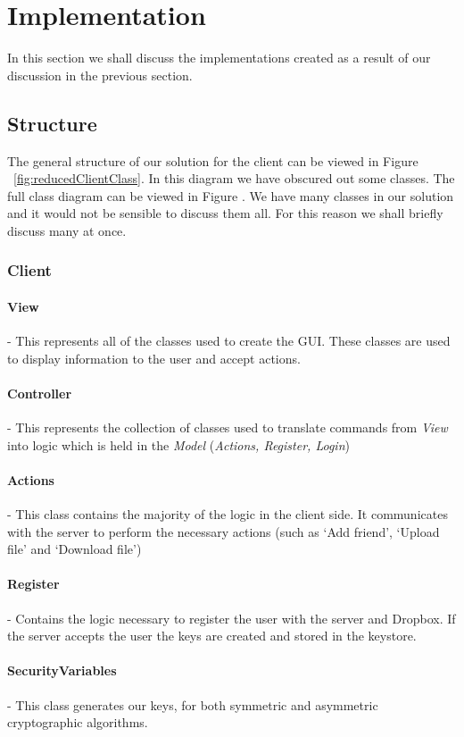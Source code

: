 \documentclass[12pt, titlepage]{article}
\begin{document}
\section{Implementation}
In this section we shall discuss the implementations created as a result of our discussion in the previous section.
\subsection{Structure}
The general structure of our solution for the client can be viewed in Figure ~\ref{fig:reducedClientClass}. In this diagram we have obscured out some classes. The full class diagram can be viewed in Figure .
\newline \indent We have many classes in our solution and it would not be sensible to discuss them all. For this reason we shall briefly discuss many at once.

\subsubsection{Client}

\paragraph*{View} - This represents all of the classes used to create the GUI. These classes are used to display information to the user and accept actions.
\paragraph*{Controller} - This represents the collection of classes used to translate commands from \textit{View} into logic which is held in the \textit{Model} (\textit{Actions, Register, Login})
\paragraph*{Actions} - This class contains the majority of the logic in the client side. It communicates with the server to perform the necessary actions (such as `Add friend', `Upload file' and `Download file')
\paragraph*{Register} - Contains the logic necessary to register the user with the server and Dropbox. If the server accepts the user the keys are created and stored in the keystore.
\paragraph*{SecurityVariables} - This class generates our keys, for both symmetric and asymmetric cryptographic algorithms.
\end{document}
